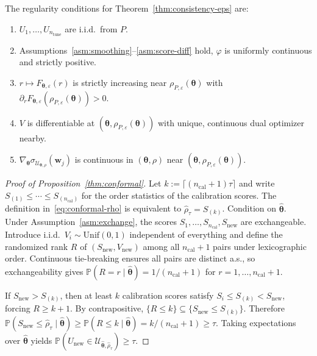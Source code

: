 \documentclass[11pt]{article}
\newcommand{\Prob}{\mathbb{P}}
\newcommand{\cU}{\mathcal{U}}
\newcommand{\btheta}{\bm{\theta}}
\newcommand{\bw}{\bm{w}}
\theoremstyle{definition}
\begin{document}
\smallskip
The regularity conditions for Theorem~\ref{thm:consistency-eps} are:
\begin{enumerate}
\item[(A1)] $U_1,\ldots,U_{n_{\mathrm{tune}}}$ are i.i.d.\ from $P$.
\item[(A2)] Assumptions~\ref{asm:smoothing}--\ref{asm:score-diff} hold, $\varphi$ is uniformly continuous and strictly positive.
\item[(A3)] $r\mapsto F_{\btheta,\varepsilon}(r)$ is strictly increasing near $\rho_{P,\varepsilon}(\btheta)$ with $\partial_r F_{\btheta,\varepsilon}(\rho_{P,\varepsilon}(\btheta))>0$.
\item[(A4)] $V$ is differentiable at $(\btheta,\rho_{P,\varepsilon}(\btheta))$ with unique, continuous dual optimizer nearby.
\item[(A5)] $\nabla_{\btheta}\sigma_{\cU_{\btheta,\rho}}(\bw_j)$ is continuous in $(\btheta,\rho)$ near $(\btheta,\rho_{P,\varepsilon}(\btheta))$.
\end{enumerate}

\begin{proof}[Proof of Proposition~\ref{thm:conformal}]
Let $k := \lceil (n_{\mathrm{cal}}+1)\tau \rceil$ and write $S_{(1)} \le \cdots \le S_{(n_{\mathrm{cal}})}$ for the order statistics of the calibration scores. The definition in~\eqref{eq:conformal-rho} is equivalent to $\hat\rho_\tau = S_{(k)}$. Condition on $\hat{\btheta}$. Under Assumption~\ref{asm:exchange}, the scores $S_1,\ldots,S_{n_{\mathrm{cal}}},S_{\mathrm{new}}$ are exchangeable. Introduce i.i.d.\ $V_i\sim\mathrm{Unif}(0,1)$ independent of everything and define the randomized rank $R$ of $(S_{\mathrm{new}},V_{\mathrm{new}})$ among all $n_{\mathrm{cal}}+1$ pairs under lexicographic order. Continuous tie-breaking ensures all pairs are distinct a.s., so exchangeability gives $\Prob(R=r\mid\hat{\btheta})=1/(n_{\mathrm{cal}}+1)$ for $r=1,\ldots,n_{\mathrm{cal}}+1$.

If $S_{\mathrm{new}}>S_{(k)}$, then at least $k$ calibration scores satisfy $S_i\le S_{(k)}<S_{\mathrm{new}}$, forcing $R\ge k+1$. By contrapositive, $\{R\le k\}\subseteq\{S_{\mathrm{new}}\le S_{(k)}\}$. Therefore
$\Prob(S_{\mathrm{new}}\le\hat\rho_\tau\mid\hat{\btheta}) \ge \Prob(R\le k\mid\hat{\btheta}) = k/(n_{\mathrm{cal}}+1) \ge \tau$.
Taking expectations over $\hat{\btheta}$ yields $\Prob(U_{\mathrm{new}}\in\cU_{\hat{\btheta},\hat\rho_\tau})\ge\tau$.
\end{proof}
\end{document}
